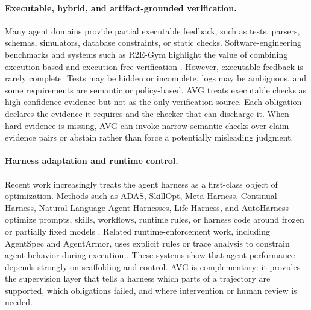 \documentclass{article} %
\newcommand{\AVG}{\textsc{AVG}\xspace}
\begin{document}
\paragraph{Executable, hybrid, and artifact-grounded verification.}
Many agent domains provide partial executable feedback, such as tests, parsers, schemas, simulators, database constraints, or static checks. Software-engineering benchmarks and systems such as R2E-Gym highlight the value of combining execution-based and execution-free verification \citep{jain2025r2egym}. However, executable feedback is rarely complete. Tests may be hidden or incomplete, logs may be ambiguous, and some requirements are semantic or policy-based. \AVG treats executable checks as high-confidence evidence but not as the only verification source. Each obligation declares the evidence it requires and the checker that can discharge it. When hard evidence is missing, \AVG can invoke narrow semantic checks over claim-evidence pairs or abstain rather than force a potentially misleading judgment.

\paragraph{Harness adaptation and runtime control.}
Recent work increasingly treats the agent harness as a first-class object of optimization. Methods such as ADAS, SkillOpt, Meta-Harness, Continual Harness, Natural-Language Agent Harnesses, Life-Harness, and AutoHarness optimize prompts, skills, workflows, runtime rules, or harness code around frozen or partially fixed models \citep{hu2025adas,yang2026skillopt,lee2026metaharness,karten2026continual,pan2026nlah,xu2026lifeharness,lou2026autoharness}. Related runtime-enforcement work, including AgentSpec and AgentArmor, uses explicit rules or trace analysis to constrain agent behavior during execution \citep{wang2025agentspec,wang2025agentarmor}. These systems show that agent performance depends strongly on scaffolding and control. \AVG is complementary: it provides the supervision layer that tells a harness which parts of a trajectory are supported, which obligations failed, and where intervention or human review is needed.
\end{document}
